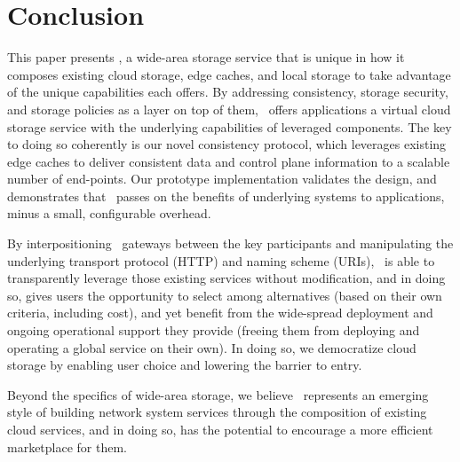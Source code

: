 \section{Conclusion}
\label{sec:conclusion}

This paper presents \Syndicate, a wide-area storage service that
is unique in how it composes existing cloud storage, edge caches,
and local storage to take advantage of the unique capabilities each offers.
By addressing consistency, storage security, and storage policies
as a layer on top of them, \Syndicate\ offers applications a virtual cloud storage
service with the underlying capabilities of leveraged components.
The key to doing so coherently is our novel 
consistency protocol, which leverages existing edge caches to deliver 
consistent data and control plane information to 
a scalable number of end-points.  Our prototype implementation 
validates the design, and demonstrates that \Syndicate\ 
passes on the benefits of underlying systems to applications,
minus a small, configurable overhead.

By interpositioning \Syndicate\ gateways between the key participants
and manipulating the underlying transport protocol (HTTP) and naming
scheme (URIs), \Syndicate\ is able to transparently leverage those
existing services without modification, and in doing so, gives users
the opportunity to select among alternatives (based on their own
criteria, including cost), and yet benefit from the wide-spread
deployment and ongoing operational support they provide
(freeing them from deploying and operating a global service on
their own).  In doing so, we democratize cloud storage by 
enabling user choice and lowering the barrier to entry.

Beyond the specifics of wide-area storage, we believe
\Syndicate\ represents an emerging style of building network system services
through the composition of existing cloud services, and in doing so,
has the potential to encourage a more efficient marketplace for them.
